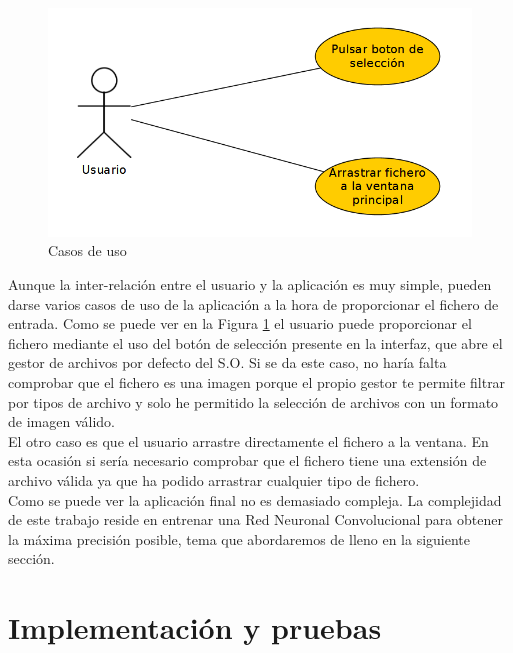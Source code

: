 \documentclass[a4paper,11pt]{book}
\begin{document}
\begin{figure}[t]
	\centering
	\includegraphics[width=0.7\linewidth]{imagenes/usecases}
	\caption[Casos de uso.]{Casos de uso}
	\label{fig:usecases}
\end{figure}

Aunque la inter-relación entre el usuario y la aplicación es muy simple, pueden darse varios casos de uso de la aplicación a la hora de proporcionar el fichero de entrada. Como se puede ver en la Figura \ref{fig:usecases} el usuario puede proporcionar el fichero mediante el uso del botón de selección presente en la interfaz, que abre el gestor de archivos por defecto del S.O. Si se da este caso, no haría falta comprobar que el fichero es una imagen porque el propio gestor te permite filtrar por tipos de archivo y solo he permitido la selección de archivos con un formato de imagen válido.\\
El otro caso es que el usuario arrastre directamente el fichero a la ventana. En esta ocasión si sería necesario comprobar que el fichero tiene una extensión de archivo válida ya que ha podido arrastrar cualquier tipo de fichero.\\
Como se puede ver la aplicación final no es demasiado compleja. La complejidad de este trabajo reside en entrenar una Red Neuronal Convolucional para obtener la máxima precisión posible, tema que abordaremos de lleno en la siguiente sección.



\section{Implementación y pruebas}
\end{document}
